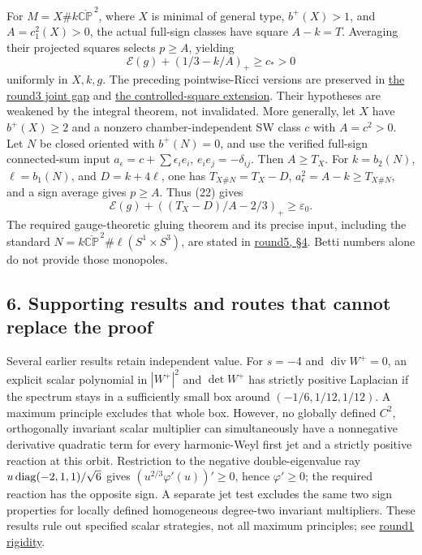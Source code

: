 \documentclass[
  english,
]{article}
\begin{document}
For \(M=X\#k\overline{\mathbb{CP}}^{\,2}\), where \(X\) is minimal of
general type, \(b^+(X)>1\), and \(A=c_1^2(X)>0\), the actual full-sign
classes have square \(A-k=T\). Averaging their projected squares selects
\(p\ge A\), yielding \[
             \mathcal E(g)+(1/3-k/A)_+\ge c_*>0
                                                               \tag{23}
\] uniformly in \(X,k,g\). The preceding pointwise-Ricci versions are
preserved in \href{../proofs/round3_joint_gap.md}{the round3 joint gap}
and \href{../proofs/round3_general_monopole.md}{the controlled-square
extension}. Their hypotheses are weakened by the integral theorem, not
invalidated. More generally, let \(X\) have \(b^+(X)\ge2\) and a nonzero
chamber-independent SW class \(c\) with \(A=c^2>0\). Let \(N\) be closed
oriented with \(b^+(N)=0\), and use the verified full-sign connected-sum
input \(a_\epsilon=c+\sum\epsilon_i e_i\), \(e_ie_j=-\delta_{ij}\). Then
\(A\ge T_X\). For \(k=b_2(N)\), \(\ell=b_1(N)\), and \(D=k+4\ell\), one
has \(T_{X\#N}=T_X-D\), \(a_\epsilon^2=A-k\ge T_{X\#N}\), and a sign
average gives \(p\ge A\). Thus (22) gives \[
       \mathcal E(g)+((T_X-D)/A-2/3)_+\ge\varepsilon_0 .
\] The required gauge-theoretic gluing theorem and its precise input,
including the standard
\(N=k\overline{\mathbb{CP}}^{\,2} \#\ell(S^1\times S^3)\), are stated in
\href{../proofs/round5_rigidity.md}{round5, §4}. Betti numbers alone do
not provide those monopoles.

\hypertarget{supporting-results-and-routes-that-cannot-replace-the-proof}{%
\subsection{6. Supporting results and routes that cannot replace the
proof}\label{supporting-results-and-routes-that-cannot-replace-the-proof}}

Several earlier results retain independent value. For \(s=-4\) and
\(\operatorname{div}W^+=0\), an explicit scalar polynomial in
\(|W^+|^2\) and \(\det W^+\) has strictly positive Laplacian if the
spectrum stays in a sufficiently small box around \((-1/6,1/12,1/12)\).
A maximum principle excludes that whole box. However, no globally
defined \(C^2\), orthogonally invariant scalar multiplier can
simultaneously have a nonnegative derivative quadratic term for every
harmonic-Weyl first jet and a strictly positive reaction at this orbit.
Restriction to the negative double-eigenvalue ray
\(u\,{\rm diag}(-2,1,1)/\sqrt6\) gives \((u^{2/3}\varphi'(u))'\ge0\),
hence \(\varphi'\ge0\); the required reaction has the opposite sign. A
separate jet test excludes the same two sign properties for locally
defined homogeneous degree-two invariant multipliers. These results rule
out specified scalar strategies, not all maximum principles; see
\href{../proofs/rigidity.md}{round1 rigidity}.
\end{document}
